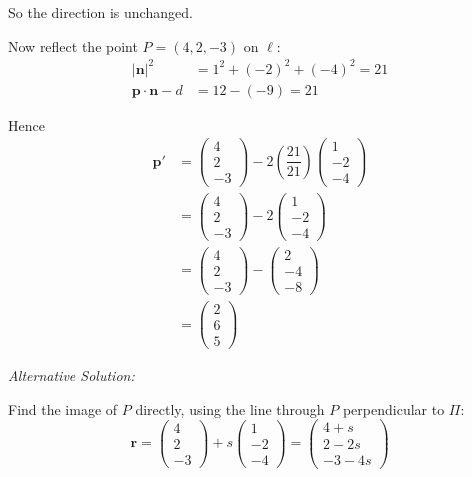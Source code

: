 \documentclass[leqno]{article}
\begin{document}
\begin{enumerate}[
  label=\textbf{\arabic*.},
  leftmargin=*,
  topsep=0pt,
  partopsep=0pt,
  parsep=0pt
]
\begin{djsSolution}
\begin{enumerate}[label=\textbf{(\roman*)}]
So the direction is unchanged.

Now reflect the point \(P=(4,2,-3)\) on \(\ell\):
\begin{align*}
|\mathbf n|^2&=1^2+(-2)^2+(-4)^2=21 \\
\mathbf p\cdot \mathbf n-d&=12-(-9)=21
\end{align*}

Hence
\begin{align*}
\mathbf p'
&=\begin{pmatrix}4\\2\\-3\end{pmatrix}
-2\left(\dfrac{21}{21}\right)\begin{pmatrix}1\\-2\\-4\end{pmatrix} \\
&=\begin{pmatrix}4\\2\\-3\end{pmatrix}
-2\begin{pmatrix}1\\-2\\-4\end{pmatrix} \\
&=\begin{pmatrix}4\\2\\-3\end{pmatrix}
-\begin{pmatrix}2\\-4\\-8\end{pmatrix} \\
&=\begin{pmatrix}2\\6\\5\end{pmatrix}
\end{align*}

{\setlength{\parskip}{8pt}%
\textit{Alternative Solution:}

Find the image of \(P\) directly, using the line through \(P\) perpendicular to \(\Pi\):
\[
\mathbf r=\begin{pmatrix}4\\2\\-3\end{pmatrix}+s\begin{pmatrix}1\\-2\\-4\end{pmatrix}=\begin{pmatrix}4+s\\2-2s\\-3-4s\end{pmatrix}
\]

}
\end{enumerate}
\end{djsSolution}
\end{enumerate}
\end{document}

